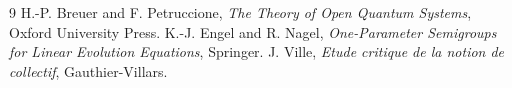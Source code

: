 \documentclass[11pt,a4paper]{article}
\begin{document}
\begin{thebibliography}{9}
 H.-P. Breuer and F. Petruccione, \emph{The Theory of Open Quantum Systems}, Oxford University Press.
 K.-J. Engel and R. Nagel, \emph{One-Parameter Semigroups for Linear Evolution Equations}, Springer.
 J. Ville, \emph{Etude critique de la notion de collectif}, Gauthier-Villars.
\end{thebibliography}
\end{document}
